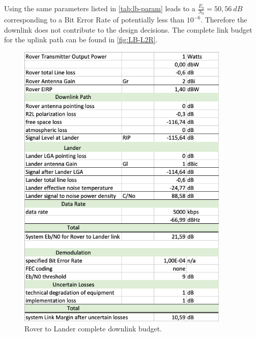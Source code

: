 Using the same parameters listed in \autoref{tab:lb-param} leads to a $\frac{{E}_{b}}{{N}_{0}} = 50,56\ dB$ corresponding to a Bit Error Rate of potentially less than $10^{-6}$. Therefore the downlink does not contribute to the design decisions. The complete link budget for the uplink path can be found in \autoref{fig:LB-L2R}.

\begin{figure}[hbt]
	\centering
  		\includegraphics[width=0.9\textwidth]{Media/LB-RovertoLander.png}
  \caption{Rover to Lander complete downlink budget.}
  \label{fig:LB-R2L}
\end{figure}

